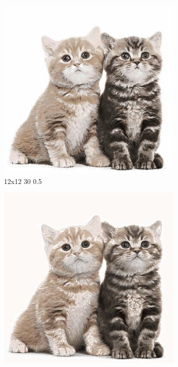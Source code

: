 \documentclass[12pt,a4paper]{article}
\begin{document}
\begin{figure}[H]
\medskip
\begin{subfigure}{0.25\textwidth}
  \includegraphics[width=\linewidth]{images/big/12-12-30-05}
  \caption{12x12 30 0.5}
  \label{fig:6}
\end{subfigure}
\begin{subfigure}{0.25\textwidth}
  \includegraphics[width=\linewidth]{images/big/16-16-30-05}

\end{subfigure}
\end{figure}
\end{document}
